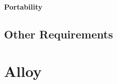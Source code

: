 \documentclass[a4paper,11pt]{report} %
\begin{document}
	\paragraph{Portability}
	
	\subsection{Other Requirements}
	
	\pagebreak
	
	\section{Alloy}
	
	
\end{document}
